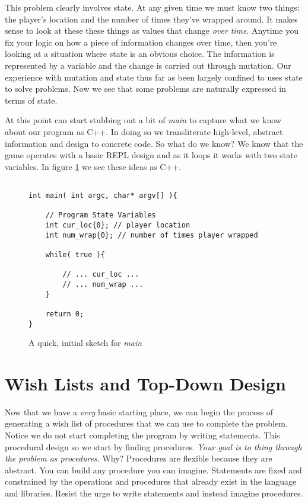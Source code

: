 \documentclass[nobib]{tufte-handout}
\begin{document}
This problem clearly involves state. At any given time we must know two things: the player's location and the number of times they've wrapped around. It makes sense to look at these these things as values that change \textit{over time}. Anytime you fix your logic on how a piece of information changes over time, then you're looking at a situation where state is an obvious choice. The information is represented by a variable and the change is carried out through mutation. Our experience with mutation and state thus far as been largely confined to uses state to solve problems. Now we see that some problems are naturally expressed in terms of state. 

At this point can start stubbing out a bit of \textit{main} to capture what we know about our program as C++. In doing so we  transliterate high-level, abstract information and design to concrete code.  So what do we know? We know that the game operates with a basic REPL design and as it loops it works with two state variables. In figure \ref{fig:mainstub1} we see these ideas as C++.
 
\begin{figure}[!htbp]
\begin{lstlisting}

int main( int argc, char* argv[] ){

	// Program State Variables
	int cur_loc{0}; // player location
	int num_wrap{0}; // number of times player wrapped
	
	while( true ){
	
		// ... cur_loc ...
	 	// ... num_wrap ...
	}

	return 0;
}

\end{lstlisting}
\caption{A quick, initial sketch for \textit{main}}
\label{fig:mainstub1}
\end{figure}

\section{Wish Lists and Top-Down Design}

Now that we have a \textit{very} basic starting place, we can begin the process of generating a wish list of procedures that we can use to complete the problem. Notice we do not start completing the program by writing statements. This procedural design so we start by finding procedures. \textit{Your goal is to thing through the problem as procedures}. Why? Procedures are flexible because they are abstract. You can build any procedure you can imagine. Statements are fixed and constrained by the operations and procedures that already exist in the language and libraries. Resist the urge to write statements and instead imagine procedures. 
\end{document}
